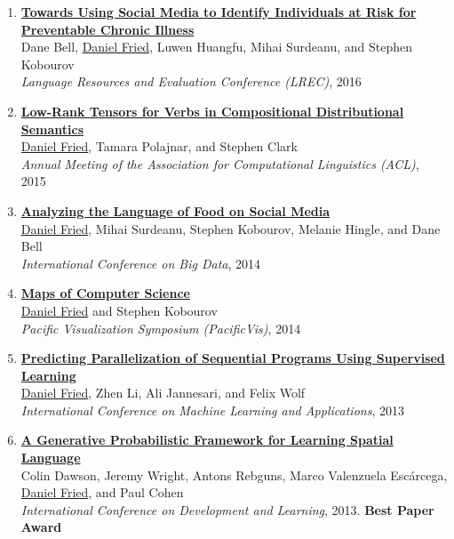 \begin{enumerate}[leftmargin=-1mm,partopsep=0pt]
  \item \href{http://arxiv.org/abs/1603.03784}{\textbf{Towards Using Social Media to Identify Individuals at Risk for Preventable Chronic Illness}}\\
    Dane Bell, \underline{Daniel Fried}, Luwen Huangfu, Mihai Surdeanu, and Stephen Kobourov\\
    \emph{Language Resources and Evaluation Conference (LREC)}, 2016



  \item \href{https://people.eecs.berkeley.edu/~dfried/papers/FPC-verb_tensors.pdf}{\textbf{Low-Rank Tensors for Verbs in Compositional Distributional Semantics}}\\
    \underline{Daniel Fried}, Tamara Polajnar, and Stephen Clark \\
    \emph{Annual Meeting of the Association for Computational Linguistics (ACL)}, 2015


  \item \href{https://people.eecs.berkeley.edu/~dfried/papers/Fried-bigdata2014.pdf}{\textbf{Analyzing the Language of Food on Social Media}}\\
    \underline{Daniel Fried}, Mihai Surdeanu, Stephen Kobourov, Melanie Hingle, and Dane Bell \\
    \emph{International Conference on Big Data}, 2014

  \item \href{https://arxiv.org/abs/1304.2681}{\textbf{Maps of Computer Science}}\\
    \underline{Daniel Fried} and Stephen Kobourov \\
    \emph{Pacific Visualization Symposium (PacificVis)}, 2014

  \item \href{https://people.eecs.berkeley.edu/~dfried/papers/Fried-ICMLA2013.pdf}{\textbf{Predicting Parallelization of Sequential Programs Using Supervised Learning}}\\
    \underline{Daniel Fried}, Zhen Li, Ali Jannesari, and Felix Wolf \\
    \emph{International Conference on Machine Learning and Applications}, 2013

  \item \href{https://people.eecs.berkeley.edu/~dfried/papers/ICDL2013.pdf}{\textbf{A Generative Probabilistic Framework for Learning Spatial Language}}\\
    Colin Dawson, Jeremy Wright, Antons Rebguns, Marco Valenzuela Esc\'arcega, \underline{Daniel Fried}, and Paul Cohen \\
    \emph{International Conference on Development and Learning}, 2013. \textbf{Best Paper Award}


\end{enumerate}
